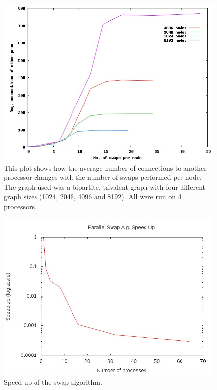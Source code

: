 \documentclass[pdftex,12pt,a4paper]{article}
\begin{document}
\begin{figure}
\centering
\includegraphics[scale=0.6]{swaps_per_node.jpg}
\caption{This plot shows how the average number of connections to another processor changes with the number of swaps performed per node. The graph used was a bipartite, trivalent graph with four different graph sizes (1024, 2048, 4096 and 8192). All were run on 4 processors.}
\end{figure}



\begin{figure}
\centering
\includegraphics[scale=0.8]{swap_speed.jpg}
\caption{Speed up of the swap algorithm.}
\end{figure}
\end{document}
